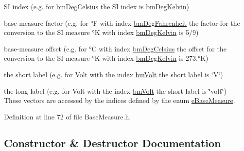 \begin{DoxyItemize}
\item SI index (e.\+g. for \hyperlink{BaseMeasure_8h_ac90e5164ccf1f0d648fba7e94b229a11a42cee40c384c9bbda9aa488151b590b4}{bm\+Deg\+Celsius} the SI index is \hyperlink{BaseMeasure_8h_ac90e5164ccf1f0d648fba7e94b229a11a7d519faa41d1d34d9c378cfc61254074}{bm\+Deg\+Kelvin})
\item base-\/measure factor (e.\+g. for °F with index \hyperlink{BaseMeasure_8h_ac90e5164ccf1f0d648fba7e94b229a11add58e3d33a5d9459dbe3bf9d3f90777c}{bm\+Deg\+Fahrenheit} the factor for the conversion to the SI measure °K with index \hyperlink{BaseMeasure_8h_ac90e5164ccf1f0d648fba7e94b229a11a7d519faa41d1d34d9c378cfc61254074}{bm\+Deg\+Kelvin} is 5/9)
\item base-\/measure offset (e.\+g. for °C with index \hyperlink{BaseMeasure_8h_ac90e5164ccf1f0d648fba7e94b229a11a42cee40c384c9bbda9aa488151b590b4}{bm\+Deg\+Celsius} the offset for the conversion to the SI measure °K with index \hyperlink{BaseMeasure_8h_ac90e5164ccf1f0d648fba7e94b229a11a7d519faa41d1d34d9c378cfc61254074}{bm\+Deg\+Kelvin} is 273.°K)
\item the short label (e.\+g. for Volt with the index \hyperlink{BaseMeasure_8h_ac90e5164ccf1f0d648fba7e94b229a11a662f2aa09627247b53e6f3c5cd10815e}{bm\+Volt} the short label is \char`\"{}\+V\char`\"{})
\item the long label (e.\+g. for Volt with the index \hyperlink{BaseMeasure_8h_ac90e5164ccf1f0d648fba7e94b229a11a662f2aa09627247b53e6f3c5cd10815e}{bm\+Volt} the short label is \char`\"{}volt\char`\"{})~\newline
 These vectors are accessed by the indices defined by the enum \hyperlink{BaseMeasure_8h_ac90e5164ccf1f0d648fba7e94b229a11}{e\+Base\+Measure}.~\newline
 
\end{DoxyItemize}

Definition at line 72 of file Base\+Measure.\+h.



\subsection{Constructor \& Destructor Documentation}
\mbox{\label{classCBaseMeasure_a6a369b1e556d95a938b0e75647b5a602}} 
